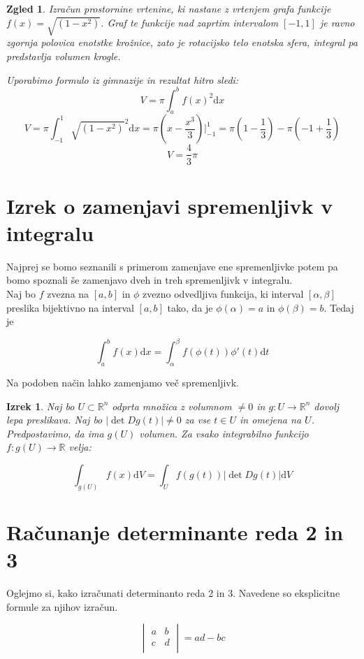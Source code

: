 \documentclass[12pt, a4paper]{article}
\newtheorem{izrek}{Izrek}
\newtheorem{zgled}{Zgled}
\begin{document}
\begin{zgled} 
Izračun prostornine vrtenine, ki nastane z vrtenjem grafa funkcije $f(x)=\sqrt{(1-x^2)}$. Graf te funkcije nad zaprtim intervalom $[-1,1]$ je ravno zgornja polovica enotstke krožnice, zato je rotacijsko telo enotska sfera, integral pa predstavlja volumen krogle.

Uporabimo formulo iz gimnazije in rezultat hitro sledi:
$$V=\pi \int_{a}^b{f(x)}^2\mathrm{d} x$$
$$V=\pi \int_{-1}^1{{\sqrt{(1-x^2)}}}^2\mathrm{d} x=\pi(x-\frac{x^3}{3})\big|_{-1}^1= \pi (1-\frac{1}{3})-\pi (-1+\frac{1}{3})$$
$$V=\frac{4}{3}\pi$$
\end{zgled}


\section{Izrek o zamenjavi spremenljivk v integralu}
Najprej se bomo seznanili s primerom zamenjave ene spremenljivke potem pa bomo spoznali še zamenjavo dveh in treh spremenljivk v integralu.
\\
Naj bo $f$ zvezna na $[a,b]$ in $\phi$ zvezno odvedljiva funkcija, ki interval $[\alpha,\beta]$ preslika bijektivno na interval $[a,b]$ tako, da je  $\phi(\alpha)=a$ in $\phi(\beta)=b$. Tedaj je

$$\int_{a}^bf(x)\mathrm{d} x=\int_{\alpha}^{\beta}f(\phi(t))\phi'(t)\mathrm{d} t$$

Na podoben način lahko zamenjamo več spremenljivk. 
\begin{izrek}
Naj bo $U \subset \mathbb{R}^n$ odprta množica z volumnom $\neq 0$ in $g:U \rightarrow \mathbb{R}^n$ dovolj lepa preslikava. Naj bo $\big | \det Dg(t) \big |\neq 0$ za vse $t \in U$ in omejena na $U$. Predpostavimo, da ima $g(U)$ volumen. Za vsako integrabilno funkcijo $f:g(U) \rightarrow \mathbb{R}$ velja:

$$\int_{g(U)}^{}f(x) \mathrm{d} V=\int_{U}^{}f(g(t)) \big |\det Dg(t) \big | \mathrm{d} V$$
\end{izrek}

\section{Računanje determinante reda 2 in 3}

Oglejmo si, kako izračunati determinanto reda 2 in 3. Navedene so eksplicitne formule za njihov izračun.

\[
\begin{vmatrix}
    a& b  \\
   c &d \\
\end{vmatrix}
=ad-bc
\]
\end{document}
